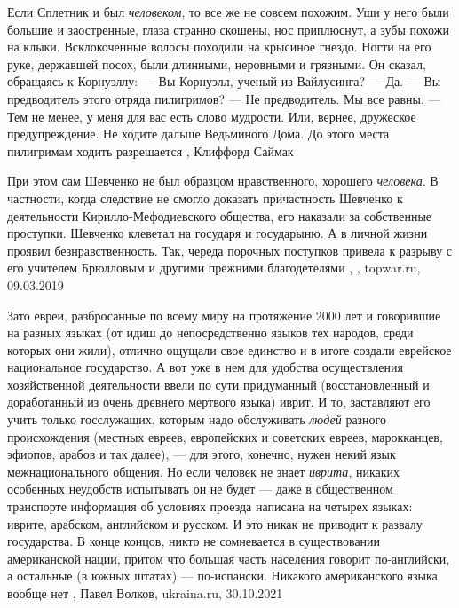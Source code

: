 Если Сплетник и был \emph{человеком}, то все же не совсем похожим. Уши у него были
большие и заостренные, глаза странно скошены, нос приплюснут, а зубы похожи на
клыки. Всклокоченные волосы походили на крысиное гнездо. Ногти на его руке,
державшей посох, были длинными, неровными и грязными.  Он сказал, обращаясь к
Корнуэллу: — Вы Корнуэлл, ученый из Вайлусинга?  — Да.  — Вы предводитель этого
отряда пилигримов?  — Не предводитель. Мы все равны.  — Тем не менее, у меня
для вас есть слово мудрости. Или, вернее, дружеское предупреждение. Не ходите
дальше Ведьминого Дома. До этого места пилигримам ходить разрешается
, Клиффорд Саймак

При этом сам Шевченко не был образцом нравственного, хорошего \emph{человека}. В
частности, когда следствие не смогло доказать причастность Шевченко к
деятельности Кирилло-Мефодиевского общества, его наказали за собственные
проступки. Шевченко клеветал на государя и государыню. А в личной жизни проявил
безнравственность. Так, череда порочных поступков привела к разрыву с его
учителем Брюлловым и другими прежними благодетелями
, , topwar.ru, 09.03.2019

Зато евреи, разбросанные по всему миру на протяжение 2000 лет и говорившие на
разных языках (от идиш до непосредственно языков тех народов, среди которых они
жили), отлично ощущали свое единство и в итоге создали еврейское национальное
государство. А вот уже в нем для удобства осуществления хозяйственной
деятельности ввели по сути придуманный (восстановленный и доработанный из очень
древнего мертвого языка) иврит. И то, заставляют его учить только госслужащих,
которым надо обслуживать \emph{людей} разного происхождения (местных евреев,
европейских и советских евреев, марокканцев, эфиопов, арабов и так далее), —
для этого, конечно, нужен некий язык межнационального общения.  Но если человек
не знает \emph{иврита}, никаких особенных неудобств испытывать он не будет —
даже в общественном транспорте информация об условиях проезда написана на
четырех языках: иврите, арабском, английском и русском. И это никак не приводит
к развалу государства. В конце концов, никто не сомневается в существовании
американской нации, притом что большая часть населения говорит по-английски, а
остальные (в южных штатах) — по-испански. Никакого американского языка вообще
нет
, 
Павел Волков, ukraina.ru, 30.10.2021

